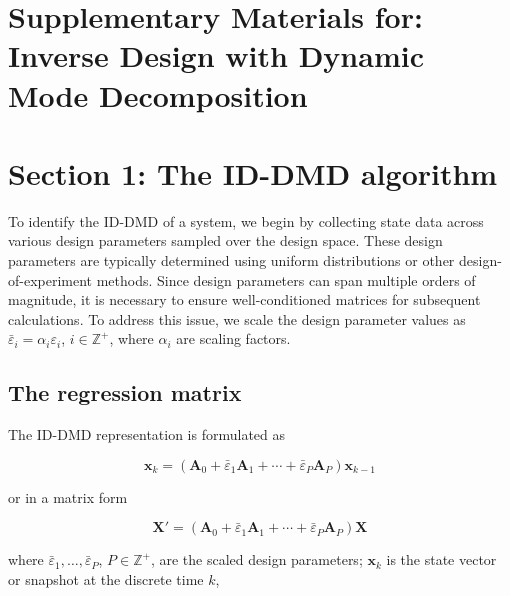 

\onecolumngrid
\section*{Supplementary Materials for:\\
Inverse Design with Dynamic Mode Decomposition}

\section{Section 1: The ID-DMD algorithm}

To identify the ID-DMD of a system, we begin by collecting state data across various design parameters sampled over the design space. These design parameters are typically determined using uniform distributions or other design-of-experiment methods. Since design parameters can span multiple orders of magnitude, it is necessary to ensure well-conditioned matrices for subsequent calculations. To address this issue, we scale the design parameter values as ${\bar{\varepsilon}_{i}}={\alpha_{i}}{\varepsilon_{i}}$, $i\in {\mathbb{Z}^{+}}$, where ${\alpha_{i}}$ are scaling factors.

\subsection{The regression matrix}
The ID-DMD representation is formulated as

\begin{equation}  
    \mathbf{x}_{k}=(\mathbf{A}_{0}+{\bar\varepsilon_{1}}{\mathbf{A}_{1}}+\cdots +{\bar\varepsilon_{P}}{\mathbf{A}_{P}}){\mathbf{x}_{k-1}} \label{eqS1}
\end{equation}

\noindent or in a matrix form

\begin{equation}  
    \mathbf{X'}=(\mathbf{A}_{0}+{\bar\varepsilon_{1}}{\mathbf{A}_{1}}+\cdots +{\bar\varepsilon_{P}}{\mathbf{A}_{P}})\mathbf{X} \label{eqS2}
\end{equation}

\noindent where $\bar\varepsilon_{1},\ldots,\bar\varepsilon_{P}$, $P\in {\mathbb{Z}^{+}}$, are the scaled design parameters; $\mathbf{x}_{k}$ is the state vector or snapshot at the discrete time $k$, \\

